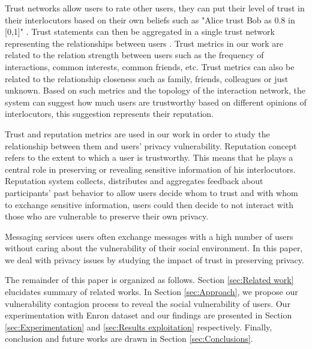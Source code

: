 Trust networks allow users to rate other users,
	they can put their level of trust in their interlocutors based on their own beliefs such as "Alice trust Bob as 0.8 in [0,1]" \cite{massa_trustaware_2007}.
Trust statements can then be aggregated in a single trust network representing the relationships between users \cite{massa_trustaware_2007}.
Trust metrics in our work are related to the relation strength between users such as the frequency of interactions,
	common interests,
	common friends, etc.
Trust metrics can also be related to the relationship closeness such as family,
	friends,
	colleagues or just unknown.
Based on such metrics and the topology of the interaction network,
	the system can suggest how much users are trustworthy based on different opinions of interlocutors,
	this suggestion represents their reputation.

Trust and reputation metrics are used in our work in order to study the relationship between them and users' privacy vulnerability.
Reputation concept refers to the extent to which a user is trustworthy.
This means that he plays a central role in preserving or revealing sensitive information of his interlocutors.
Reputation system collects,
	distributes and aggregates feedback about participants’ past behavior to allow users decide whom to trust and with whom to exchange sensitive information,
	users could then decide to not interact with those who are vulnerable to preserve their own privacy.

Messaging services users often exchange messages with a high number of users without caring about the vulnerability of their social environment.
In this paper,
	we deal with privacy issues by studying the impact of trust in preserving privacy.

The remainder of this paper is organized as follows.
Section \ref{sec:Related work} elucidates summary of related works.
In Section \ref{sec:Approach},
	we propose our vulnerability contagion process to reveal the social vulnerability of users.
Our experimentation with Enron dataset and our findings are presented in Section \ref{sec:Experimentation} and \ref{sec:Results exploitation} respectively.
Finally,
	conclusion and future works are drawn in Section \ref{sec:Conclusions}.


